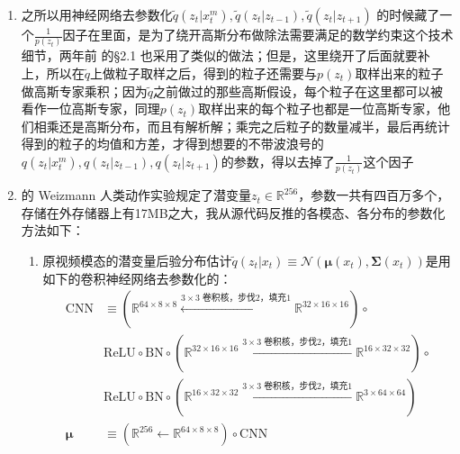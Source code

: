 \documentclass[11pt]{article}
\begin{document}
\begin{enumerate}
\[\begin{bmatrix}
\mu_1\\
\mu_2\\
\mu_3\\
\mu_4
\end{bmatrix},\boldsymbol{\Sigma}=0.001I_5+\begin{bmatrix}
e^{\sigma_0}&0&0&0&0\\
0&e^{\sigma_1}&0&0&0\\
0&0&e^{\sigma_2}&0&0\\
0&0&0&e^{\sigma_3}&0\\
0&0&0&0&e^{\sigma_4}
\end{bmatrix}
\right)
\]
\item \cite{Tan2019FactorizedII} 之所以用神经网络去参数化$\tilde{q}(z_t|x_t^m), \tilde{q}(z_t|z_{t-1}), \tilde{q}(z_t|z_{t+1})$ 的时候藏了一个$\frac{1}{p(z_t)}$因子在里面，是为了绕开高斯分布做除法需要满足的数学约束这个技术细节，两年前 \cite{NIPS2018_7801} 的\S2.1 也采用了类似的做法；但是，这里绕开了后面就要补上，所以在$\tilde{q}$上做粒子取样之后，得到的粒子还需要与$p(z_t)$取样出来的粒子做高斯专家乘积；因为$\tilde{q}$之前做过的那些高斯假设，每个粒子在这里都可以被看作一位高斯专家，同理$p(z_t)$取样出来的每个粒子也都是一位高斯专家，他们相乘还是高斯分布，而且有解析解\cite{DBLP:journals/corr/CaoF14}；乘完之后粒子的数量减半，最后再统计得到的粒子的均值和方差，才得到想要的不带波浪号的 $q(z_t|x_t^m), q(z_t|z_{t-1}), q(z_t|z_{t+1})$的参数，得以去掉了$\frac{1}{p(z_t)}$这个因子
\item \cite{Tan2019FactorizedII} 的 Weizmann 人类动作实验规定了潜变量$z_t\in\mathbb{R}^{256}$，参数一共有四百万多个，存储在外存储器上有17MB之大，我从源代码反推的各模态、各分布的参数化方法如下：
\begin{enumerate}
\item 原视频模态的潜变量后验分布估计$\tilde{q}(z_t|x_t)\equiv\mathcal{N}(\boldsymbol{\mu}(x_t),\boldsymbol{\Sigma}(x_t))$是用如下的卷积神经网络去参数化的：\[
\begin{split}
\text{CNN}&\equiv(\mathbb{R}^{64\times8\times8}\xleftarrow{3\times3\text{ 卷积核，步伐2，填充1}}\mathbb{R}^{32\times16\times16})\circ\\
&\text{ReLU}\circ\text{BN}\circ(\mathbb{R}^{32\times16\times16}\xleftarrow{3\times3\text{ 卷积核，步伐2，填充1}}\mathbb{R}^{16\times32\times32})\circ\\
&\text{ReLU}\circ\text{BN}\circ(\mathbb{R}^{16\times32\times32}\xleftarrow{3\times3\text{ 卷积核，步伐2，填充1}}\mathbb{R}^{3\times64\times64})\\
\boldsymbol{\mu}&\equiv(\mathbb{R}^{256}\leftarrow\mathbb{R}^{64\times8\times8})\circ\text{CNN}\\

\end{split}\]
\end{enumerate}
\end{enumerate}
\end{document}
